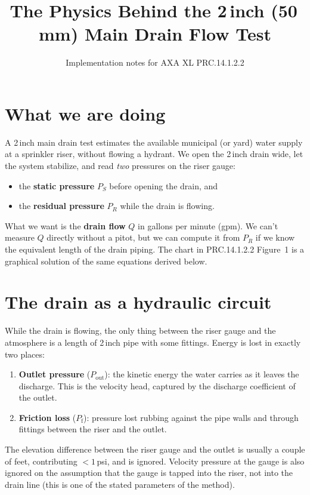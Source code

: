 \documentclass[11pt]{article}
\title{The Physics Behind the 2\,inch (50\,mm) Main Drain Flow Test}
\author{Implementation notes for AXA XL PRC.14.1.2.2}
\date{}
\begin{document}
\maketitle

\section*{What we are doing}

A 2\,inch main drain test estimates the available municipal (or yard) water
supply at a sprinkler riser, without flowing a hydrant. We open the
2\,inch drain wide, let the system stabilize, and read \emph{two} pressures
on the riser gauge:
\begin{itemize}
  \item the \textbf{static pressure} $P_S$ before opening the drain, and
  \item the \textbf{residual pressure} $P_R$ while the drain is flowing.
\end{itemize}

What we want is the \textbf{drain flow} $Q$ in gallons per minute (gpm).
We can't measure $Q$ directly without a pitot, but we can compute it from
$P_R$ if we know the equivalent length of the drain piping. The chart in
PRC.14.1.2.2 Figure~1 is a graphical solution of the same equations
derived below.

\section{The drain as a hydraulic circuit}

While the drain is flowing, the only thing between the riser gauge and the
atmosphere is a length of 2\,inch pipe with some fittings. Energy is lost
in exactly two places:

\begin{enumerate}
  \item \textbf{Outlet pressure} ($P_{\text{out}}$): the kinetic energy
        the water carries as it leaves the discharge. This is the velocity
        head, captured by the discharge coefficient of the outlet.
  \item \textbf{Friction loss} ($P_{\text{f}}$): pressure lost rubbing
        against the pipe walls and through fittings between the riser and
        the outlet.
\end{enumerate}

The elevation difference between the riser gauge and the outlet is usually
a couple of feet, contributing $<1$\,psi, and is ignored. Velocity
pressure at the gauge is also ignored on the assumption that the gauge is
tapped into the riser, not into the drain line (this is one of the
stated parameters of the method).
\end{document}
